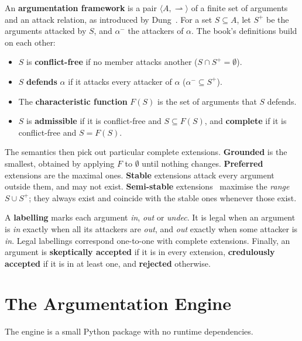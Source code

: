 \documentclass[11pt,a4paper]{article}
\newcommand{\att}{\rightharpoonup}
\begin{document}
An \textbf{argumentation framework} is a pair $\langle A, \att\rangle$ of a
finite set of arguments and an attack relation, as introduced by Dung~\cite{dung}. For a set $S \subseteq A$, let
$S^+$ be the arguments attacked by $S$, and $\alpha^-$ the attackers of
$\alpha$. The book's definitions build on each other:

\begin{itemize}
  \item $S$ is \textbf{conflict-free} if no member attacks another
        ($S \cap S^+ = \emptyset$).
  \item $S$ \textbf{defends} $\alpha$ if it attacks every attacker of $\alpha$
        ($\alpha^- \subseteq S^+$).
  \item The \textbf{characteristic function} $F(S)$ is the set of arguments
        that $S$ defends.
  \item $S$ is \textbf{admissible} if it is conflict-free and
        $S \subseteq F(S)$, and \textbf{complete} if it is conflict-free and
        $S = F(S)$.
\end{itemize}

The semantics then pick out particular complete extensions. \textbf{Grounded}
is the smallest, obtained by applying $F$ to $\emptyset$ until nothing
changes. \textbf{Preferred} extensions are the maximal ones. \textbf{Stable}
extensions attack every argument outside them, and may not exist.
\textbf{Semi-stable} extensions~\cite{caminada} maximise the \emph{range} $S \cup S^+$; they
always exist and coincide with the stable ones whenever those exist.

A \textbf{labelling} marks each argument \emph{in}, \emph{out} or
\emph{undec}. It is legal when an argument is \emph{in} exactly when all its
attackers are \emph{out}, and \emph{out} exactly when some attacker is
\emph{in}. Legal labellings correspond one-to-one with complete extensions.
Finally, an argument is \textbf{skeptically accepted} if it is in every
extension, \textbf{credulously accepted} if it is in at least one, and
\textbf{rejected} otherwise.

\section{The Argumentation Engine}

The engine is a small Python package with no runtime dependencies.
\end{document}
